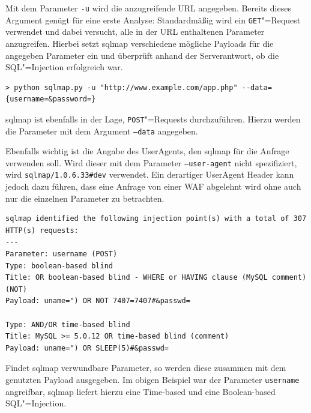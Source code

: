 Mit dem Parameter \texttt{-u} wird die anzugreifende URL angegeben. Bereits dieses Argument genügt für eine erste Analyse: Standardmäßig wird ein \texttt{GET}"=Request verwendet und dabei versucht, alle in der URL enthaltenen Parameter anzugreifen. Hierbei setzt sqlmap verschiedene mögliche Payloads für die angegeben Parameter ein und überprüft anhand der Serverantwort, ob die SQL"=Injection erfolgreich war.

\begin{listing}
\begin{verbatim}
> python sqlmap.py -u "http://www.example.com/app.php" --data={username=&password=}
\end{verbatim}
\end{listing}

sqlmap ist ebenfalls in der Lage, \texttt{POST}"=Requests durchzuführen. Hierzu werden die Parameter mit dem Argument \texttt{--data} angegeben.

Ebenfalls wichtig ist die Angabe des UserAgents, den sqlmap für die Anfrage verwenden soll. Wird dieser mit dem Parameter \texttt{--user-agent} nicht spezifiziert, wird \texttt{sqlmap/1.0.6.33\#dev} verwendet. Ein derartiger UserAgent Header kann jedoch dazu führen, dass eine Anfrage von einer WAF abgelehnt wird ohne auch nur die einzelnen Parameter zu betrachten.



\begin{listing}
\begin{verbatim}
sqlmap identified the following injection point(s) with a total of 307 HTTP(s) requests:
---
Parameter: username (POST)
Type: boolean-based blind
Title: OR boolean-based blind - WHERE or HAVING clause (MySQL comment) (NOT)
Payload: uname=") OR NOT 7407=7407#&passwd=

Type: AND/OR time-based blind
Title: MySQL >= 5.0.12 OR time-based blind (comment)
Payload: uname=") OR SLEEP(5)#&passwd=
\end{verbatim}
\end{listing}

Findet sqlmap verwundbare Parameter, so werden diese zusammen mit dem genutzten Payload ausgegeben. Im obigen Beispiel war der Parameter \texttt{username} angreifbar, sqlmap liefert hierzu eine Time-based und eine Boolean-based SQL"=Injection.

